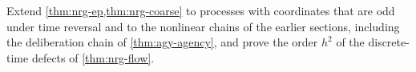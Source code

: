 \begin{openproblem}\label{open:nrg-parity}
Extend \cref{thm:nrg-ep,thm:nrg-coarse} to processes with coordinates that are odd under time reversal and to the nonlinear chains of the earlier sections, including the deliberation chain of \cref{thm:agy-agency}, and prove the order $h^2$ of the discrete-time defects of \cref{thm:nrg-flow}.
\end{openproblem}
